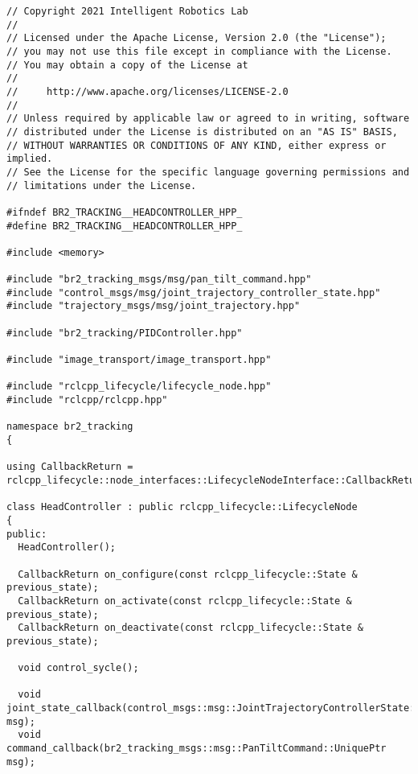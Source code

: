  \footnotesize
\begin{tcolorbox}[sharp corners, colframe=gray!80, colback=LightGray, left=0pt, top=0pt, bottom=0pt, title=\texttt{br2\_tracking/include/br2\_tracking/HeadController.hpp}]
  \begin{verbatim}
// Copyright 2021 Intelligent Robotics Lab
//
// Licensed under the Apache License, Version 2.0 (the "License");
// you may not use this file except in compliance with the License.
// You may obtain a copy of the License at
//
//     http://www.apache.org/licenses/LICENSE-2.0
//
// Unless required by applicable law or agreed to in writing, software
// distributed under the License is distributed on an "AS IS" BASIS,
// WITHOUT WARRANTIES OR CONDITIONS OF ANY KIND, either express or implied.
// See the License for the specific language governing permissions and
// limitations under the License.

#ifndef BR2_TRACKING__HEADCONTROLLER_HPP_
#define BR2_TRACKING__HEADCONTROLLER_HPP_

#include <memory>

#include "br2_tracking_msgs/msg/pan_tilt_command.hpp"
#include "control_msgs/msg/joint_trajectory_controller_state.hpp"
#include "trajectory_msgs/msg/joint_trajectory.hpp"

#include "br2_tracking/PIDController.hpp"

#include "image_transport/image_transport.hpp"

#include "rclcpp_lifecycle/lifecycle_node.hpp"
#include "rclcpp/rclcpp.hpp"

namespace br2_tracking
{

using CallbackReturn = rclcpp_lifecycle::node_interfaces::LifecycleNodeInterface::CallbackReturn;

class HeadController : public rclcpp_lifecycle::LifecycleNode
{
public:
  HeadController();

  CallbackReturn on_configure(const rclcpp_lifecycle::State & previous_state);
  CallbackReturn on_activate(const rclcpp_lifecycle::State & previous_state);
  CallbackReturn on_deactivate(const rclcpp_lifecycle::State & previous_state);

  void control_sycle();

  void joint_state_callback(control_msgs::msg::JointTrajectoryControllerState::UniquePtr msg);
  void command_callback(br2_tracking_msgs::msg::PanTiltCommand::UniquePtr msg);


\end{verbatim}
\end{tcolorbox}
